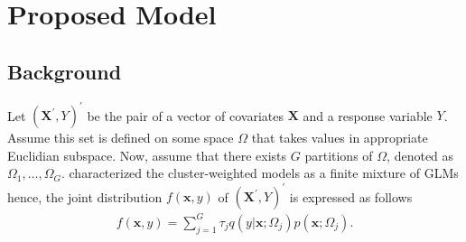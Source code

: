\documentclass[11pt,letterpaper]{article}
\numberwithin{equation}{section}
\numberwithin{equation}{section}
\numberwithin{equation}{section}
\begin{document}
\section{Proposed Model}

\subsection{Background}

Let $(\bm{X^{'}}, Y)^{'}$  be the pair of a vector of covariates  $\bm{X}$ and a response variable $Y$. Assume this set is defined on some space $\Omega$ that takes values in appropriate Euclidian subspace. Now, assume that there exists $G$ partitions of $\Omega$, denoted as $\Omega_1, \ldots, \Omega_G$.  \cite{Gershenfeld:1997} characterized the cluster-weighted models as a finite mixture of GLMs hence, the joint distribution $f(\bm x, y)$ of $(\bm{X^{'}}, Y )^{'}$  is expressed as follows
 \begin{align}
 f(\bm x, y)= \sum_{j=1}^{G} \tau_j q(y|\bm{x};\Omega_j)p(\bm{x};\Omega_j).
\label{eq1}
\end{align}
\end{document}
